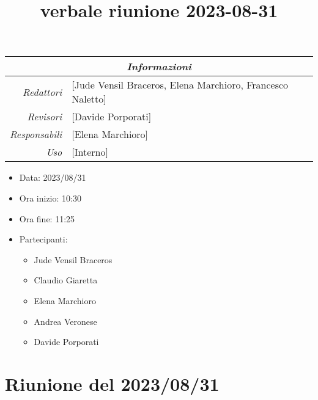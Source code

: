 \documentclass[12pt]{article}
\begin{document}
\graphicspath{ {../../templates/img} }

\title{verbale riunione 2023-08-31}

\firstPage
\maketitle

\begin{center}
\begin{tabular}{r | l}
    \multicolumn{2}{c}{\textit{Informazioni}}\\
    \hline
    
        \textit{Redattori} &
        [Jude Vensil Braceros, Elena Marchioro, Francesco Naletto]\makecell{}\\
    
        \textit{Revisori} &
        [Davide Porporati]\makecell{}\\
        \textit{Responsabili} &
        [Elena Marchioro]\makecell{}\\
            \textit{Uso} & 
            [Interno]\makecell{}\\
\end{tabular}
    \begin{itemize}
    \item[] Data: 2023/08/31
    \item[] Ora inizio: 10:30
    \item[] Ora fine: 11:25
    \item[] Partecipanti:
    \begin{itemize}
    \item[] Jude Vensil Braceros
    \item[] Claudio Giaretta
    \item[] Elena Marchioro
    \item[] Andrea Veronese
    \item[] Davide Porporati
    \end{itemize}
\end{itemize}
\end{center}


\tableofcontents
\printindex 
\section{Riunione del 2023/08/31}
\end{document}
